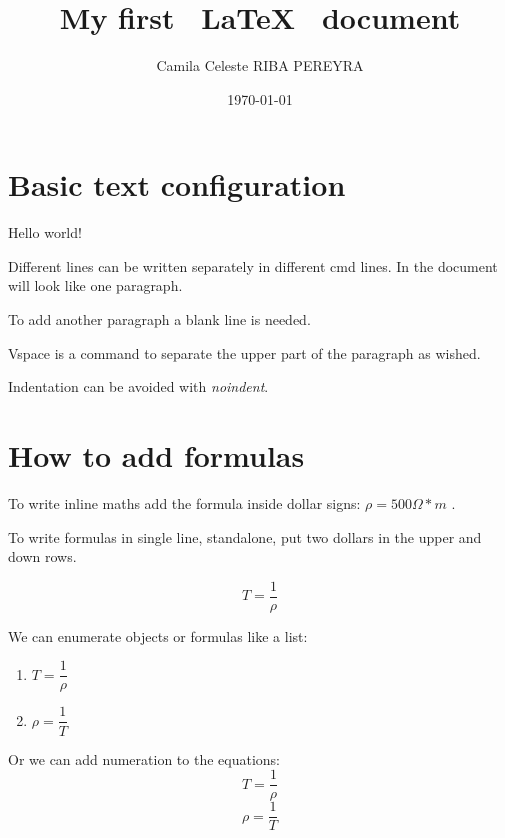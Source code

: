 \documentclass[10pt,a4paper]{article}
\title{My first ~\LaTeX~ document}
\author{Camila Celeste RIBA PEREYRA}
\date{\today}
\begin{document}
\maketitle
\tableofcontents %

\section{Basic text configuration}

Hello world!

Different lines can be written separately in different cmd lines.
In the document will look like one paragraph.

To add another paragraph a blank line is needed.

\vspace{1cm} Vspace is a command to separate the upper part of the paragraph as wished.

\noindent Indentation can be avoided with \emph{noindent}.

\section{How to add formulas}
To write inline maths add the formula inside dollar signs:
$\rho = 500 \Omega * m$ .

To write formulas in single line, standalone, put two dollars in the upper and down rows.

$$
T = \dfrac{1}{\rho}
$$

\noindent We can enumerate objects or formulas like a list: 

\begin{enumerate}
\item  $T = \dfrac{1}{\rho}$
\item  ${\rho} = \dfrac{1}{T}$
\end{enumerate}

\noindent Or we can add numeration to the equations:
\begin{equation}
T = \dfrac{1}{\rho}
\end{equation}
\begin{equation}
{\rho} = \dfrac{1}{T}
\label{eq:personalised label}
\end{equation}
\end{document}
